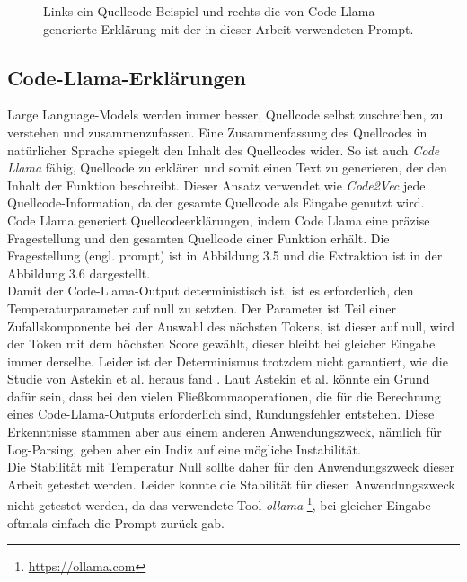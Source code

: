 \documentclass[12pt,letterpaper,ngerman]{article}
\begin{document}
\begin{figure}
  \begin{center}
    \begin{minipage}[c]{6cm}
        \centering
        \inputminted[fontsize=\scriptsize]{c}{summary.c}
    \end{minipage}
    \hspace{0.1cm}
    \begin{minipage}[c]{6cm}
        \centering
        \inputminted[fontsize=\scriptsize,breaklines]{json}{summary.json}
    \end{minipage}
  \end{center}
  \caption{
  Links ein Quellcode-Beispiel und rechts die von 
  Code Llama generierte Erklärung mit der in dieser 
  Arbeit verwendeten Prompt.
}
\end{figure}
\subsection{Code-Llama-Erklärungen}
Large Language-Models werden immer besser, Quellcode selbst
zuschreiben, zu verstehen und zusammenzufassen. Eine Zusammenfassung des Quellcodes
in natürlicher Sprache spiegelt den Inhalt des Quellcodes wider.
So ist auch \textit{Code Llama} fähig, Quellcode zu erklären und
somit einen Text zu generieren, der den Inhalt der Funktion 
beschreibt. Dieser Ansatz verwendet wie \textit{Code2Vec} 
jede Quellcode-Information, da der 
gesamte Quellcode als Eingabe genutzt wird.\\
Code Llama generiert Quellcodeerklärungen, indem Code Llama eine
präzise  Fragestellung und den gesamten Quellcode einer 
Funktion erhält.
Die Fragestellung (engl. prompt) ist in Abbildung 3.5
und die Extraktion ist in der Abbildung 3.6 dargestellt.\\
Damit der Code-Llama-Output deterministisch ist,
ist es erforderlich, den Temperaturparameter auf null zu setzten. 
Der Parameter ist Teil einer Zufallskomponente bei der
Auswahl des nächsten Tokens, ist dieser auf null,
wird der Token mit dem höchsten Score gewählt, dieser 
bleibt bei gleicher Eingabe immer derselbe. Leider ist der
Determinismus trotzdem nicht garantiert, 
wie die Studie von Astekin et al. heraus fand
\cite{llmstable}. Laut Astekin et al. könnte ein Grund dafür sein,
dass bei den vielen Fließkommaoperationen, die für die Berechnung
eines Code-Llama-Outputs erforderlich sind,
Rundungsfehler entstehen. Diese Erkenntnisse stammen aber 
aus einem anderen Anwendungszweck, nämlich für Log-Parsing, 
geben aber ein Indiz auf eine mögliche Instabilität.\\
Die Stabilität mit Temperatur Null sollte daher für den
Anwendungszweck dieser Arbeit getestet werden. Leider 
konnte die Stabilität für diesen Anwendungszweck nicht 
getestet werden, da das verwendete Tool \textit{ollama}
\footnote{\url{https://ollama.com}}, bei gleicher
Eingabe oftmals einfach die Prompt zurück gab.
\end{document}
